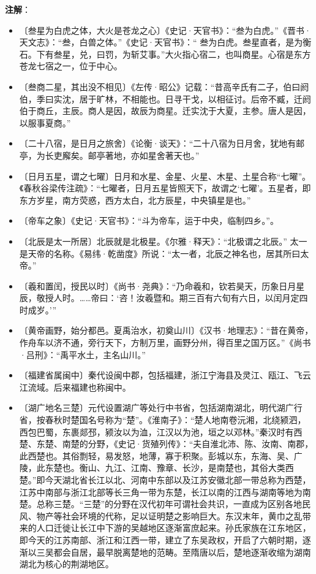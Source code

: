 \documentclass[12pt,UTF-8,openany]{ctexbook}
\begin{document}
\newpage

\textbf{注解}：

\vspace{-1em}

\begin{itemize}
    \setlength\itemsep{-0.2em}
    \item〔叁星为白虎之体，大火是苍龙之心〕《史记·天官书》：“叁为白虎。”《晋书·天文志》：“叁，白兽之体。”《史记·天官书》：“ 叁为白虎。叁星直者，是为衡石。下有叁星，兑，曰罚，为斩艾事。”大火指心宿二，也叫商星。心宿是东方苍龙七宿之一，位于中心。
    \item〔叁商二星，其出没不相见〕《左传·昭公》记载：“昔高辛氏有二子，伯曰阏伯，季曰实沈，居于旷林，不相能也。日寻干戈，以相征讨。后帝不臧，迁阏伯于商丘，主辰。商人是因，故辰为商星。迁实沈于大夏，主参。唐人是因，以服事夏商。”
    \item〔二十八宿，是日月之旅舍〕《论衡·谈天》：“二十八宿为日月舍，犹地有邮亭，为长吏廨矣。邮亭著地，亦如星舍著天也。”
    \item〔日月五星，谓之七曜〕日月和水星、金星、火星、木星、土星合称“七曜”。《春秋谷梁传注疏》：“七曜者，日月五星皆照天下，故谓之‘七曜’。五星者，即东方岁星，南方荧惑，西方太白，北方辰星，中央镇星是也。”
    \item〔帝车之象〕《史记·天官书》：“斗为帝车，运于中央，临制四乡。”。
    \item〔北辰是太一所居〕北辰就是北极星。《尔雅·释天》：“北极谓之北辰。” 太一是天帝的名称。《易纬·乾凿度》所说：“太一者，北辰之神名也，居其所曰太帝。”
    \item〔羲和置闰，授民以时〕《尚书·尧典》：“乃命羲和，钦若昊天，历象日月星辰，敬授人时。……帝曰：‘咨！汝羲暨和。期三百有六旬有六日，以闰月定四时成岁。’”
    \item〔黄帝画野，始分都邑。夏禹治水，初奠山川〕《汉书·地理志》：“昔在黄帝，作舟车以济不通，旁行天下，方制万里，画野分州，得百里之国万区。”《尚书·吕刑》：“禹平水土，主名山川。”
    \item〔福建省属闽中〕秦代设闽中郡，包括福建，浙江宁海县及灵江、瓯江、飞云江流域。后来福建也称闽中。
    \item〔湖广地名三楚〕元代设置湖广等处行中书省，包括湖南湖北，明代湖广行省，按春秋时楚国名号称为“楚”。《淮南子》：“楚人地南卷沅湘，北绕颍泗，西包巴蜀，东裹郯邳，颍汝以为洫，江汉以为池，垣之以邓林。”秦汉时有西楚、东楚、南楚的分野，《史记·货殖列传》：“夫自淮北沛、陈、汝南、南郡，此西楚也。其俗剽轻，易发怒，地薄，寡于积聚。彭城以东，东海、吴、广陵，此东楚也。衡山、九江、江南、豫章、长沙，是南楚也，其俗大类西楚。”即今天湖北省长江以北、河南中东部以及江苏安徽北部一带总称为西楚，江苏中南部与浙江北部等长三角一带为东楚，长江以南的江西与湖南等地为南楚。总称三楚。“三楚”的分野在汉代初年可谓社会共识，一直成为区别各地民风、物产等社会环境的代称，足以证明楚之影响巨大。东汉末年，黄巾之乱带来的人口迁徙让长江中下游的吴越地区逐渐富庶起来。孙氏家族在江东地区，即今天的江苏南部、浙江和江西一带，建立了东吴政权，开启了六朝时期，逐渐以三吴都会自居，最早脱离楚地的范畴。至隋唐以后，楚地逐渐收缩为湖南湖北为核心的荆湖地区。

\end{itemize}
\end{document}
